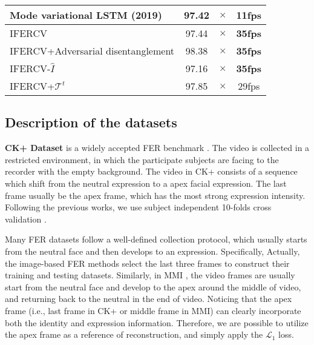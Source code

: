 \documentclass[a4paper,conference]{IEEEtran}
\begin{document}
\begin{table}[t]
{\begin{tabular}{| l | c | c | c |}
Mode variational LSTM (2019) \cite{baddar2019mode} & 97.42 & $\times$       & 11fps   \\\hline

IFERCV & 97.44 & $\times$       & \textbf{35fps}    \\
IFERCV+Adversarial disentanglement\cite{liu2019feature}   & 98.38 & $\times$       & \textbf{35fps}  \\
IFERCV-$\hat{I}$  & 97.16 & $\times$       & \textbf{35fps}   \\
IFERCV+$\mathcal{T}^t$  & 97.85 & $\times$       & 29fps     \\\hline	
	
		
	\end{tabular}	}

 	
\end{table}


\subsection{Description of the datasets}

\noindent\textbf{CK+ Dataset} is a widely accepted FER benchmark \cite{li2020deep,kumawat2019lbvcnn}. The video is collected in a restricted environment, in which the participate subjects are facing to the recorder with the empty background. The video in CK+ consists of a sequence which shift from the neutral expression to a apex facial expression. The last frame usually be the apex frame, which has the most strong expression intensity. Following the previous works, we use subject independent 10-folds cross validation \cite{liu2014learning,li2020deep,liu2018adaptive}.


Many FER datasets follow a well-defined collection protocol, which usually starts from the neutral face and then develops to an expression. Specifically,  Actually, the image-based FER methods select the last three frames to construct their training and testing datasets. Similarly, in MMI \cite{pantic2005web}, the video frames are usually start from the neutral face and develop to the apex around the middle of video, and returning back to the neutral in the end of video. Noticing that the apex frame (i.e., last frame in CK+ or middle frame in MMI) can clearly incorporate both the identity and expression information. Therefore, we are possible to utilize the apex frame as a reference of reconstruction, and simply apply the $\mathcal{L}_1$ loss.  
\end{document}
